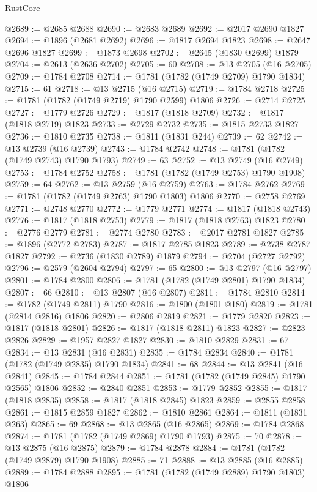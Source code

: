\begin{lexlean}{RustCore}
\begin{coremodule}
@2689 := @2685 @2688
@2690 := @2683 @2689
@2692 := @2017 @2690 @1827
@2694 := @1896 (@2681 @2692)
@2696 := @1817 @2694 @1823
@2698 := @2647 @2696 @1827
@2699 := @1873 @2698
@2702 := @2645 (@1830 @2699) @1879
@2704 := @2613 (@2636 @2702)
@2705 := 60
@2708 := @13 @2705 (@16 @2705)
@2709 := @1784 @2708
@2714 := @1781 (@1782 (@1749 @2709) @1790 @1834)
@2715 := 61
@2718 := @13 @2715 (@16 @2715)
@2719 := @1784 @2718
@2725 := @1781 (@1782 (@1749 @2719) @1790 @2599) @1806
@2726 := @2714 @2725
@2727 := @1779 @2726
@2729 := @1817 (@1818 @2709)
@2732 := @1817 (@1818 @2719) @1823
@2733 := @2729 @2732
@2735 := @1815 @2733 @1827
@2736 := @1810 @2735
@2738 := @1811 (@1831 @244)
@2739 := 62
@2742 := @13 @2739 (@16 @2739)
@2743 := @1784 @2742
@2748 := @1781 (@1782 (@1749 @2743) @1790 @1793)
@2749 := 63
@2752 := @13 @2749 (@16 @2749)
@2753 := @1784 @2752
@2758 := @1781 (@1782 (@1749 @2753) @1790 @1908)
@2759 := 64
@2762 := @13 @2759 (@16 @2759)
@2763 := @1784 @2762
@2769 := @1781 (@1782 (@1749 @2763) @1790 @1803) @1806
@2770 := @2758 @2769
@2771 := @2748 @2770
@2772 := @1779 @2771
@2774 := @1817 (@1818 @2743)
@2776 := @1817 (@1818 @2753)
@2779 := @1817 (@1818 @2763) @1823
@2780 := @2776 @2779
@2781 := @2774 @2780
@2783 := @2017 @2781 @1827
@2785 := @1896 (@2772 @2783)
@2787 := @1817 @2785 @1823
@2789 := @2738 @2787 @1827
@2792 := @2736 (@1830 @2789) @1879
@2794 := @2704 (@2727 @2792)
@2796 := @2579 (@2604 @2794)
@2797 := 65
@2800 := @13 @2797 (@16 @2797)
@2801 := @1784 @2800
@2806 := @1781 (@1782 (@1749 @2801) @1790 @1834)
@2807 := 66
@2810 := @13 @2807 (@16 @2807)
@2811 := @1784 @2810
@2814 := @1782 (@1749 @2811) @1790
@2816 := @1800 (@1801 @180)
@2819 := @1781 (@2814 @2816) @1806
@2820 := @2806 @2819
@2821 := @1779 @2820
@2823 := @1817 (@1818 @2801)
@2826 := @1817 (@1818 @2811) @1823
@2827 := @2823 @2826
@2829 := @1957 @2827 @1827
@2830 := @1810 @2829
@2831 := 67
@2834 := @13 @2831 (@16 @2831)
@2835 := @1784 @2834
@2840 := @1781 (@1782 (@1749 @2835) @1790 @1834)
@2841 := 68
@2844 := @13 @2841 (@16 @2841)
@2845 := @1784 @2844
@2851 := @1781 (@1782 (@1749 @2845) @1790 @2565) @1806
@2852 := @2840 @2851
@2853 := @1779 @2852
@2855 := @1817 (@1818 @2835)
@2858 := @1817 (@1818 @2845) @1823
@2859 := @2855 @2858
@2861 := @1815 @2859 @1827
@2862 := @1810 @2861
@2864 := @1811 (@1831 @263)
@2865 := 69
@2868 := @13 @2865 (@16 @2865)
@2869 := @1784 @2868
@2874 := @1781 (@1782 (@1749 @2869) @1790 @1793)
@2875 := 70
@2878 := @13 @2875 (@16 @2875)
@2879 := @1784 @2878
@2884 := @1781 (@1782 (@1749 @2879) @1790 @1908)
@2885 := 71
@2888 := @13 @2885 (@16 @2885)
@2889 := @1784 @2888
@2895 := @1781 (@1782 (@1749 @2889) @1790 @1803) @1806

\end{coremodule}
\end{lexlean}
